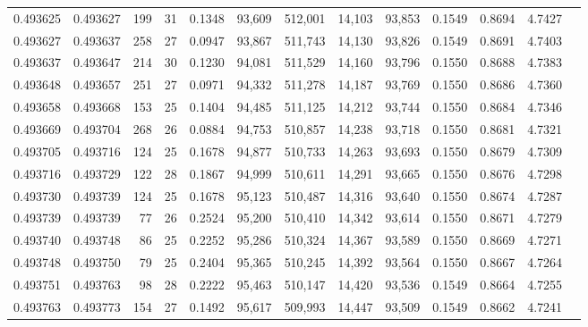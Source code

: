 \begin{tabular}{rrrrrrrrrrrrr}
0.493625 & 0.493627 & 199 &  31 &                                     0.1348 &  93,609 & 512,001 &  14,103 &  93,853 & 0.1549 & 0.8694 & 4.7427 \\
0.493627 & 0.493637 & 258 &  27 &                                     0.0947 &  93,867 & 511,743 &  14,130 &  93,826 & 0.1549 & 0.8691 & 4.7403 \\
0.493637 & 0.493647 & 214 &  30 &                                     0.1230 &  94,081 & 511,529 &  14,160 &  93,796 & 0.1550 & 0.8688 & 4.7383 \\
0.493648 & 0.493657 & 251 &  27 &                                     0.0971 &  94,332 & 511,278 &  14,187 &  93,769 & 0.1550 & 0.8686 & 4.7360 \\
0.493658 & 0.493668 & 153 &  25 &                                     0.1404 &  94,485 & 511,125 &  14,212 &  93,744 & 0.1550 & 0.8684 & 4.7346 \\
0.493669 & 0.493704 & 268 &  26 &                                     0.0884 &  94,753 & 510,857 &  14,238 &  93,718 & 0.1550 & 0.8681 & 4.7321 \\
0.493705 & 0.493716 & 124 &  25 &                                     0.1678 &  94,877 & 510,733 &  14,263 &  93,693 & 0.1550 & 0.8679 & 4.7309 \\
0.493716 & 0.493729 & 122 &  28 &                                     0.1867 &  94,999 & 510,611 &  14,291 &  93,665 & 0.1550 & 0.8676 & 4.7298 \\
0.493730 & 0.493739 & 124 &  25 &                                     0.1678 &  95,123 & 510,487 &  14,316 &  93,640 & 0.1550 & 0.8674 & 4.7287 \\
0.493739 & 0.493739 &  77 &  26 &                                     0.2524 &  95,200 & 510,410 &  14,342 &  93,614 & 0.1550 & 0.8671 & 4.7279 \\
0.493740 & 0.493748 &  86 &  25 &                                     0.2252 &  95,286 & 510,324 &  14,367 &  93,589 & 0.1550 & 0.8669 & 4.7271 \\
0.493748 & 0.493750 &  79 &  25 &                                     0.2404 &  95,365 & 510,245 &  14,392 &  93,564 & 0.1550 & 0.8667 & 4.7264 \\
0.493751 & 0.493763 &  98 &  28 &                                     0.2222 &  95,463 & 510,147 &  14,420 &  93,536 & 0.1549 & 0.8664 & 4.7255 \\
0.493763 & 0.493773 & 154 &  27 &                                     0.1492 &  95,617 & 509,993 &  14,447 &  93,509 & 0.1549 & 0.8662 & 4.7241 \\

\end{tabular}
